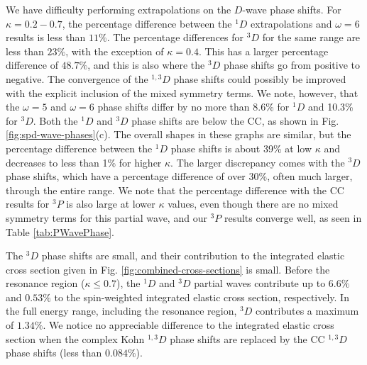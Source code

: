 \documentclass[preprint,showpacs,showkeys,preprintnumbers,amsmath,amssymb,longbibliography,pra,aps]{revtex4-1}
\begin{document}
We have difficulty performing extrapolations on the $D$-wave phase shifts. 
For $\kappa = 0.2 - 0.7$, the percentage difference between the $^1D$ 
extrapolations and $\omega = 6$ results is less than $11\%$. The percentage 
differences for $^3D$ for the same range are less than $23\%$, with the 
exception of $\kappa = 0.4$. This has a larger percentage difference of $48.7
\%$, and this is also where the $^3D$ phase shifts go from positive to 
negative. The convergence of the $^{1,3}D$ phase shifts could possibly be
improved with the explicit inclusion of the mixed symmetry terms. We note, however,
that the
$\omega = 5$ and $\omega = 6$ phase shifts differ by no more than 8.6\% for
$^1D$ and 10.3\% for $^3D$. Both the $^1D$ and $^3D$ phase shifts are below the 
CC, as shown in Fig. \ref{fig:spd-wave-phases}(c). The overall shapes in these
graphs are similar, but the percentage difference between the $^1D$ phase
shifts is about 39\% at low $\kappa$ and decreases to less than 1\% for
higher $\kappa$. The larger discrepancy comes with the $^3D$ phase shifts,
which have a percentage difference of over 30\%, often much larger,
through the entire range.
We note that the percentage difference with the CC results for $^3P$ is
also large at lower $\kappa$ values, even though there are no mixed symmetry terms
for this partial wave, and our $^3P$ results converge well, as seen in
Table \ref{tab:PWavePhase}. 

The $^3D$ phase shifts are small, and their contribution to the integrated 
elastic cross section given in Fig. \ref{fig:combined-cross-sections} is 
small. Before the resonance region ($\kappa \leq 0.7$), the $^1D$ and $^3D$ 
partial waves contribute up to $6.6\%$ and $0.53\%$ to the spin-weighted 
integrated elastic cross section, respectively. In the full energy range, 
including the resonance region, $^3D$ contributes a maximum of $1.34\%$. 
We notice no appreciable difference to the integrated elastic cross
section when the complex Kohn $^{1,3}D$ phase shifts are replaced by the CC
$^{1,3}D$ phase shifts (less than $0.084\%$).
\end{document}
